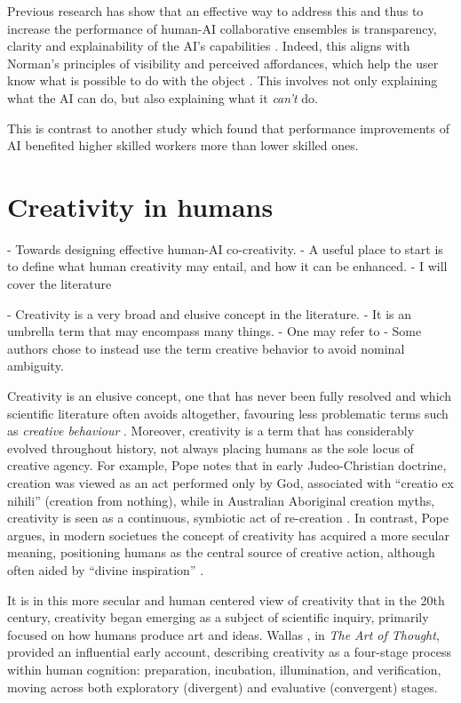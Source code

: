 Previous research has show that an effective way to address this and thus to increase the performance of human-AI collaborative ensembles is transparency, clarity and explainability of the AI's capabilities \cite{Jia2024-vp}. Indeed, this aligns with Norman's principles of visibility and perceived affordances, which help the user know what is possible to do with the object \cite{Norman1988-uq, Bray2016-ff}. This involves not only explaining what the AI can do, but also explaining what it \textit{can't} do. 

This is contrast to another study which found that performance improvements of AI benefited higher skilled workers more than lower skilled ones. 

\cite{Jia2024-vp}




\section{Creativity in humans}

- Towards designing effective human-AI co-creativity. 
- A useful place to start is to define what human creativity may entail, and how it can be enhanced. 
- I will cover the literature 

- Creativity is a very broad and elusive concept in the literature. 
- It is an umbrella term that may encompass many things. 
- One may refer to 
- Some authors chose to instead use the term creative behavior \cite{Wiggins2006-zd} to avoid nominal ambiguity. 

Creativity is an elusive concept, one that has never been fully resolved and which scientific literature often avoids altogether, favouring less problematic terms such as \emph{creative behaviour} \cite{Wiggins2006-zd}. Moreover, creativity is a term that has considerably evolved throughout history, not always placing humans as the sole locus of creative agency. For example, Pope \cite{Pope2005-za} notes that in early Judeo-Christian doctrine, creation was viewed as an act performed only by God, associated with “creatio ex nihili” (creation from nothing), while in Australian Aboriginal creation myths, creativity is seen as a continuous, symbiotic act of re-creation \cite{Pope2005-za}. In contrast, Pope argues, in modern societues the concept of creativity has acquired a more secular meaning, positioning humans as the central source of creative action, although often aided by “divine inspiration” \cite{Pope2005-za}.

It is in this more secular and human centered view of creativity that in the 20th century, creativity began emerging as a subject of scientific inquiry, primarily focused on how humans produce art and ideas. Wallas \cite{Wallas1926-ky}, in \emph{The Art of Thought}, provided an influential early account, describing creativity as a four-stage process within human cognition: preparation, incubation, illumination, and verification, moving across both exploratory (divergent) and evaluative (convergent) stages.


